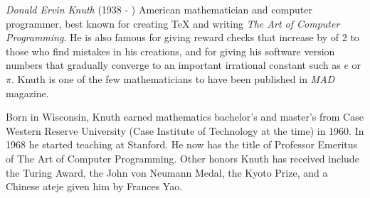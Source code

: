\documentclass[12pt]{article}
\begin{document}
{\em Donald Ervin Knuth} (1938 - ) American mathematician and computer programmer, best known for creating \TeX{} and writing {\it The Art of Computer Programming}. He is also famous for giving reward checks that increase by  of 2 to those who find mistakes in his creations, and for giving his software version numbers that gradually converge to an important irrational constant such as $e$ or $\pi$. Knuth is one of the few mathematicians to have been published in {\it MAD} magazine.

Born in Wisconsin, Knuth earned mathematics bachelor's and master's  from Case Western Reserve University (Case Institute of Technology at the time) in 1960. In 1968 he started teaching at Stanford. He now has the title of Professor Emeritus of The Art of Computer Programming. Other honors Knuth has received include the Turing Award, the John von Neumann Medal, the Kyoto Prize, and a Chinese ateje given him by Frances Yao.
\end{document}
